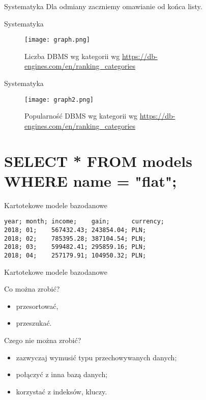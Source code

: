 \begin{frame}{Systematyka}
	Dla odmiany zaczniemy omawianie od końca listy.
\end{frame}

\begin{frame}{Systematyka}
	\begin{figure}[t]
		\centering
		\texttt{[image: graph.png]}
		\caption{Liczba DBMS wg kategorii wg \url{https://db-engines.com/en/ranking_categories}}
	\end{figure}
\end{frame}

\begin{frame}{Systematyka}
	\begin{figure}[t]
		\centering
		\texttt{[image: graph2.png]}
		\caption{Popularność DBMS wg kategorii wg \url{https://db-engines.com/en/ranking_categories}}
	\end{figure}
\end{frame}

\section{SELECT * FROM models WHERE name = "flat";}

\begin{frame}[fragile]{Kartotekowe modele bazodanowe}
	\begin{lstlisting}
year; month; income;    gain;      currency;
2018; 01;    567432.43; 243854.04; PLN;
2018; 02;    785395.28; 387104.54; PLN;
2018; 03;    599482.41; 295859.16; PLN;
2018; 04;    257179.91; 104950.32; PLN;
	\end{lstlisting}
\end{frame}

\begin{frame}[fragile]{Kartotekowe modele bazodanowe}

	Co można zrobić?
	\begin{itemize}
		\item przesortować,
		\item przeszukać.
	\end{itemize}
	
	Czego nie można zrobić?
	\begin{itemize}
		\item zazwyczaj wymusić typu przechowywanych danych;
		\item połączyć z inna bazą danych;
		\item korzystać z indeksów, kluczy.
	\end{itemize}
\end{frame}

